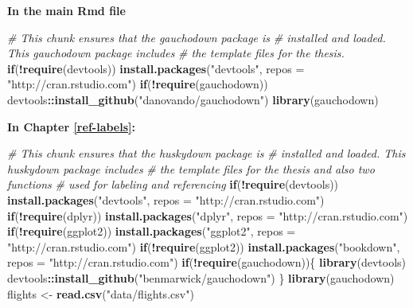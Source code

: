 \documentclass[twoside,12pt,final]{ucthesis-CA2012}
\newenvironment{Shaded}{}{}
\newcommand{\KeywordTok}[1]{\textcolor[rgb]{0.00,0.44,0.13}{\textbf{{#1}}}}
\newcommand{\DataTypeTok}[1]{\textcolor[rgb]{0.56,0.13,0.00}{{#1}}}
\newcommand{\StringTok}[1]{\textcolor[rgb]{0.25,0.44,0.63}{{#1}}}
\newcommand{\CommentTok}[1]{\textcolor[rgb]{0.38,0.63,0.69}{\textit{{#1}}}}
\newcommand{\NormalTok}[1]{{#1}}
\newcommand{\OperatorTok}[1]{\textcolor[rgb]{0.00,0.44,0.13}{\textbf{{#1}}}}
\newcommand{\ControlFlowTok}[1]{\textcolor[rgb]{0.00,0.44,0.13}{\textbf{{#1}}}}
\begin{document}
\begin{ucmainmatter}
\textbf{In the main Rmd file}
\begin{Shaded}
\begin{Highlighting}[]
\CommentTok{# This chunk ensures that the gauchodown package is}
\CommentTok{# installed and loaded. This gauchodown package includes}
\CommentTok{# the template files for the thesis.}
\ControlFlowTok{if}\NormalTok{(}\OperatorTok{!}\KeywordTok{require}\NormalTok{(devtools))}
  \KeywordTok{install.packages}\NormalTok{(}\StringTok{"devtools"}\NormalTok{, }\DataTypeTok{repos =} \StringTok{"http://cran.rstudio.com"}\NormalTok{)}
\ControlFlowTok{if}\NormalTok{(}\OperatorTok{!}\KeywordTok{require}\NormalTok{(gauchodown))}
\NormalTok{  devtools}\OperatorTok{::}\KeywordTok{install_github}\NormalTok{(}\StringTok{"danovando/gauchodown"}\NormalTok{)}
\KeywordTok{library}\NormalTok{(gauchodown)}
\end{Highlighting}
\end{Shaded}
\textbf{In Chapter \ref{ref-labels}:}
\begin{Shaded}
\begin{Highlighting}[]
\CommentTok{# This chunk ensures that the huskydown package is}
\CommentTok{# installed and loaded. This huskydown package includes}
\CommentTok{# the template files for the thesis and also two functions}
\CommentTok{# used for labeling and referencing}
\ControlFlowTok{if}\NormalTok{(}\OperatorTok{!}\KeywordTok{require}\NormalTok{(devtools))}
  \KeywordTok{install.packages}\NormalTok{(}\StringTok{"devtools"}\NormalTok{, }\DataTypeTok{repos =} \StringTok{"http://cran.rstudio.com"}\NormalTok{)}
\ControlFlowTok{if}\NormalTok{(}\OperatorTok{!}\KeywordTok{require}\NormalTok{(dplyr))}
    \KeywordTok{install.packages}\NormalTok{(}\StringTok{"dplyr"}\NormalTok{, }\DataTypeTok{repos =} \StringTok{"http://cran.rstudio.com"}\NormalTok{)}
\ControlFlowTok{if}\NormalTok{(}\OperatorTok{!}\KeywordTok{require}\NormalTok{(ggplot2))}
    \KeywordTok{install.packages}\NormalTok{(}\StringTok{"ggplot2"}\NormalTok{, }\DataTypeTok{repos =} \StringTok{"http://cran.rstudio.com"}\NormalTok{)}
\ControlFlowTok{if}\NormalTok{(}\OperatorTok{!}\KeywordTok{require}\NormalTok{(ggplot2))}
    \KeywordTok{install.packages}\NormalTok{(}\StringTok{"bookdown"}\NormalTok{, }\DataTypeTok{repos =} \StringTok{"http://cran.rstudio.com"}\NormalTok{)}
\ControlFlowTok{if}\NormalTok{(}\OperatorTok{!}\KeywordTok{require}\NormalTok{(gauchodown))\{}
  \KeywordTok{library}\NormalTok{(devtools)}
\NormalTok{  devtools}\OperatorTok{::}\KeywordTok{install_github}\NormalTok{(}\StringTok{"benmarwick/gauchodown"}\NormalTok{)}
\NormalTok{  \}}
\KeywordTok{library}\NormalTok{(gauchodown)}
\NormalTok{flights <-}\StringTok{ }\KeywordTok{read.csv}\NormalTok{(}\StringTok{"data/flights.csv"}\NormalTok{)}
\end{Highlighting}
\end{Shaded}
\hypertarget{the-second-appendix-for-fun}{%
}
\end{ucmainmatter}
\end{document}
